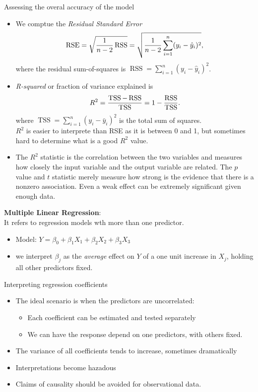 \documentclass[11pt, a4paper]{article}
\begin{document}
Assessing the overal accuracy of the model
\begin{itemize}
  \item We comptue the \emph{Residual Standard Error}
    \[
      \operatorname{RSE}=\sqrt{{1 \over n- 2} \operatorname{RSS}}=\sqrt{ {1 \over n-2} \sum_{i=1}^n (y_i-\hat{y}_i)^2},
    \]
    where the residual sum-of-squares is $\operatorname{RSS}=\sum_{i=1}^n (y_i-\hat{y}_i)^2$.
  \item \emph{R-squared} or fraction of variance explained is 
    \[
      R^2={\operatorname{TSS}-\operatorname{RSS} \over \operatorname{TSS} }=1-{\operatorname{RSS}\over\operatorname{TSS}}.
    \]
    where $\operatorname{TSS}=\sum_{i=1}^n (y_i-\bar{y}_i)^2$ is the total sum of squares.\\
$R^2$ is easier to interprete than RSE as it is between 0 and 1, but sometimes hard to determine what is a good $R^2$ value.
\item The $R^2$ statistic is the correlation between the two variables and measures how closely the input variable and the output variable are related. The $p$ value and $t$ statistic merely measure how strong is the evidence that there is a nonzero association. Even a weak effect can be extremely significant given enough data.\\[1mm] 
\end{itemize}
\textbf{Multiple Linear Regression}:\\[1mm]
It refers to regression models wth more than one predictor.
\begin{itemize}
\item Model: $Y=\beta_0+\beta_1 X_1 + \beta_2 X_2 + \beta_3 X_3$
\item we interpret $\beta_j$ as the \emph{average} effect on $Y$ of a one unit increase in $X_j$, holding all other predictors fixed.
\end{itemize}
Interpreting regression coefficients
\begin{itemize}
\item The ideal scenario is when the predictors are uncorrelated:
\begin{itemize}
\item Each coefficient can be estimated and tested separately
\item We can have the response depend on one predictors, with others fixed. 
\end{itemize}
\item The variance of all coefficients tends to increase, sometimes dramatically
\item Interpretations become hazadous
\item Claims of causality should be avoided for observational data.
\end{itemize}
\end{document}

